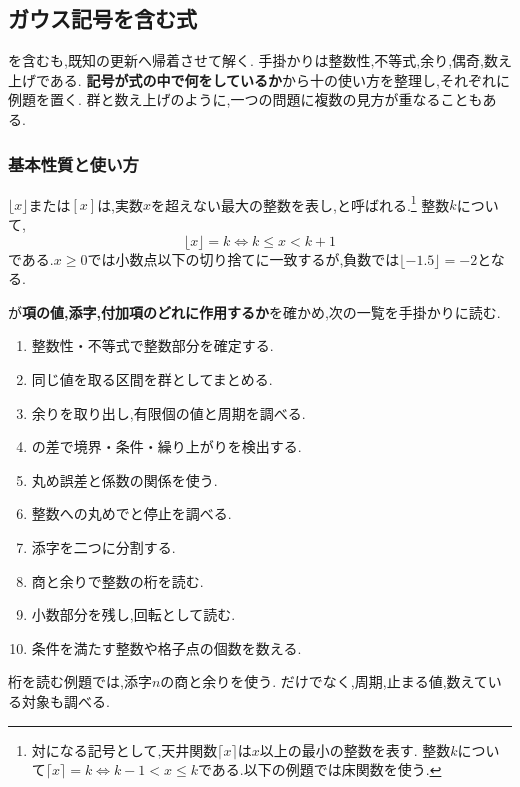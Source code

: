 \subsection{ガウス記号を含む式}\label{節：ガウス記号を含む式}
を含むも,既知の更新へ帰着させて解く.
手掛かりは整数性,不等式,余り,偶奇,数え上げである.
\textbf{記号が式の中で何をしているか}から十の使い方を整理し,それぞれに例題を置く.
群と数え上げのように,一つの問題に複数の見方が重なることもある.

\subsubsection{基本性質と使い方}\label{節：基本性質と使い方}
$\lfloor x\rfloor$または$[x]$は,実数$x$を超えない最大の整数を表し,と呼ばれる.\footnote{対になる記号として,天井関数$\lceil x\rceil$は$x$以上の最小の整数を表す.
  整数$k$について$\lceil x\rceil=k\iff k-1<x\le k$である.以下の例題では床関数を使う.}
整数$k$について,
\[
  \lfloor x\rfloor=k\iff k\le x<k+1
\]
である.$x\ge0$では小数点以下の切り捨てに一致するが,負数では$\lfloor-1.5\rfloor=-2$となる.

\BookFigFloorGraph

が\textbf{項の値,添字,付加項のどれに作用するか}を確かめ,次の一覧を手掛かりに読む.
\begin{enumerate}[label=(\arabic*)]
  \item 整数性・不等式で整数部分を確定する.
  \item 同じ値を取る区間を群としてまとめる.
  \item 余りを取り出し,有限個の値と周期を調べる.
  \item {}の差で境界・条件・繰り上がりを検出する.
  \item 丸め誤差と係数の関係を使う.
  \item 整数への丸めでと停止を調べる.
  \item 添字を二つに分割する.
  \item 商と余りで整数の桁を読む.
  \item 小数部分を残し,回転として読む.
  \item 条件を満たす整数や格子点の個数を数える.
\end{enumerate}
桁を読む例題では,添字$n$の商と余りを使う.
だけでなく,周期,止まる値,数えている対象も調べる.

